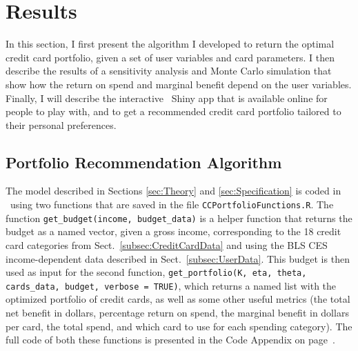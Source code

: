 \section{Results}   \label{sec:Results}

In this section, I first present the algorithm I developed to return the optimal credit card portfolio, given a set of user variables and card parameters.
I then describe the results of a sensitivity analysis and Monte Carlo simulation that show how the return on spend and marginal benefit depend on the user variables.
Finally, I will describe the interactive \sR\ \textsf{Shiny} app that is available online for people to play with, and to get a recommended credit card portfolio tailored to their personal preferences. 

\subsection{Portfolio Recommendation Algorithm}

The model described in Sections \ref{sec:Theory} and \ref{sec:Specification} is coded in \sR\ using two functions that are saved in the file \texttt{CCPortfolioFunctions.R}.
The function \texttt{get\_budget(income, budget\_data)} is a helper function that returns the budget as a named vector, given a gross income, corresponding to the 18 credit card categories from Sect.~\ref{subsec:CreditCardData} and using the BLS CES income-dependent data described in Sect.~\ref{subsec:UserData}.
This budget is then used as input for the second function, \texttt{get\_portfolio(K, eta, theta, cards\_data, budget, verbose = TRUE)}, which returns a named list with the optimized portfolio of credit cards, as well as some other useful metrics (the total net benefit in dollars, percentage return on spend, the marginal benefit in dollars per card, the total spend, and which card to use for each spending category). 
The full code of both these functions is presented in the Code Appendix on page~\pageref{app:Code}. 

